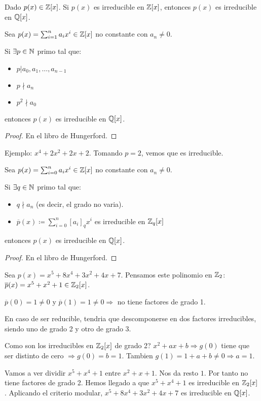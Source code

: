 \begin{lemma}
	Dado \(p(x) \in \mathbb{Z}[x]\). Si \(p(x) \) es irreducible en \(\mathbb{Z}[x ]\), entonces \(p(x )\) es irreducible en \(\mathbb{Q}[x ]\).
\end{lemma}

\begin{theorem}
	Sea \(p(x) = \sum_{i=1}^{n } a_i x^{i} \in \mathbb{Z}[x] \) no constante con \(a_n \neq 0 \).
	
	Si \(\exists p \in \mathbb{N} \) primo tal que:
	\begin{itemize}
		\item \(p | a_0, a_1 ,\ldots,a_{n-1}\)
		\item \(p \nmid a_n \)
		\item \(p^{2} \nmid a_0 \)
	\end{itemize}
	entonces \(p(x )\) es irreducible en \(\mathbb{Q}[x ]\).
\end{theorem}
\begin{proof}
	En el libro de Hungerford.
\end{proof}
\begin{example}
	Ejemplo: \(x^{4} + 2x^{2} + 2x + 2  \). Tomando \(p = 2 \), vemos que es irreducible.
\end{example}
\begin{theorem}
	Sea \(p(x) = \sum_{i=0 }^{n } a_i x^{i } \in \mathbb{Z}[x ]\) no constante con \(a_n \neq 0 \).
	
	Si \(\exists q \in \mathbb{N} \) primo tal que:
	\begin{itemize}
		\item \(q \nmid a_n \) (es decir, el grado no varia).
		\item \(\overline{p}(x) \coloneqq \sum_{i =0 }^{n } [a_i]_q x^{i} \) es irreducible en \(\mathbb{Z}_q [x ]\)
	\end{itemize}
	entonces \(p(x )\) es irreducible en \(\mathbb{Q}[x ]\).
\end{theorem}
\begin{proof}
	En el libro de Hungerford.
\end{proof}
\begin{example}
	Sea \(p(x) = x^{5} + 8x^{4} + 3x^{2} + 4x + 7\). Pensamos este polinomio en \(\mathbb{Z}_2 \): \(\overline{p}(x) = x^{5} + x^{2} + 1 \in \mathbb{Z}_2[x]  \).
	
	\(\overline{p}(0) = 1 \neq 0\) y \(\overline{p}(1) = 1 \neq 0 \Rightarrow\) no tiene factores de grado 1.
	
	En caso de ser reducible, tendria que descomponerse en dos factores irreducibles, siendo uno de grado 2 y otro de grado 3.
	
	Como son los irreducibles en \(\mathbb{Z}_2[x ]\) de grado 2? \(x^{2} + ax + b \Rightarrow g(0)\) tiene que ser distinto de cero \(\Rightarrow g(0) = b = 1\). Tambien \(g(1) = 1 + a + b \neq 0 \Rightarrow a = 1\).
	
	Vamos a ver dividir \(x^{5} + x^{4} + 1  \) entre \(x^{2} + x + 1 \). Nos da resto \(1 \). Por tanto no tiene factores de grado 2. Hemos llegado a que \(x^{5} + x^{4} + 1   \) es irreducible en \(\mathbb{Z}_2[x ]\). Aplicando el criterio modular, \(x^{5} + 8x^{4} + 3x^{2} + 4x + 7    \) es irreducible en \(\mathbb{Q}[x ]\).
\end{example}

